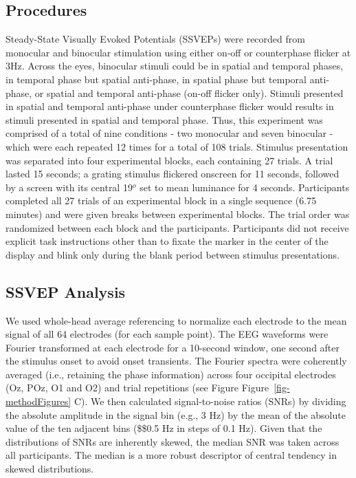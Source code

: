 \documentclass[
  12pt,
]{article}
\begin{document}
\subsection{Procedures}\label{procedures}

Steady-State Visually Evoked Potentials (SSVEPs) were recorded from
monocular and binocular stimulation using either on-off or counterphase
flicker at 3Hz. Across the eyes, binocular stimuli could be in spatial
and temporal phases, in temporal phase but spatial anti-phase, in
spatial phase but temporal anti-phase, or spatial and temporal
anti-phase (on-off flicker only). Stimuli presented in spatial and
temporal anti-phase under counterphase flicker would results in stimuli
presented in spatial and temporal phase. Thus, this experiment was
comprised of a total of nine conditions - two monocular and seven
binocular - which were each repeated 12 times for a total of 108 trials.
Stimulus presentation was separated into four experimental blocks, each
containing 27 trials. A trial lasted 15 seconds; a grating stimulus
flickered onscreen for 11 seconds, followed by a screen with its central
19\(^o\) set to mean luminance for 4 seconds. Participants completed all
27 trials of an experimental block in a single sequence (6.75 minutes)
and were given breaks between experimental blocks. The trial order was
randomized between each block and the participants. Participants did not
receive explicit task instructions other than to fixate the marker in
the center of the display and blink only during the blank period between
stimulus presentations.

\subsection{SSVEP Analysis}\label{ssvep-analysis}

We used whole-head average referencing to normalize each electrode to
the mean signal of all 64 electrodes (for each sample point). The EEG
waveforms were Fourier transformed at each electrode for a 10-second
window, one second after the stimulus onset to avoid onset transients.
The Fourier spectra were coherently averaged (i.e., retaining the phase
information) across four occipital electrodes (Oz, POz, O1 and O2) and
trial repetitions (see Figure Figure~\ref{fig-methodFigures} C). We then
calculated signal-to-noise ratios (SNRs) by dividing the absolute
amplitude in the signal bin (e.g., 3 Hz) by the mean of the absolute
value of the ten adjacent bins (\$\pm\$0.5 Hz in steps of 0.1 Hz). Given
that the distributions of SNRs are inherently skewed, the median SNR was
taken across all participants. The median is a more robust descriptor of
central tendency in skewed distributions.
\end{document}
